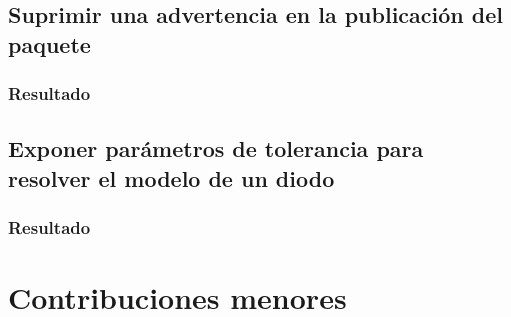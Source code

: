 \subsection{Suprimir una advertencia en la publicación del paquete}

\subsubsection{Resultado}

\subsection{Exponer parámetros de tolerancia para resolver el modelo de un diodo}

\subsubsection{Resultado}

\section{Contribuciones menores} \label{sct:desarrollo:contribuciones_documentacion}
